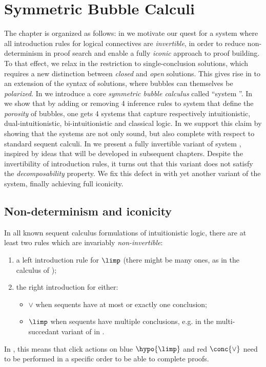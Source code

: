 \setchapterpreamble[u]{\margintoc}
\chapter{Symmetric Bubble Calculi}


The chapter is organized as follows: in  we motivate our
quest for a system where all introduction rules for logical connectives are
\emph{invertible}, in order to reduce non-determinism in proof search and enable
a fully \emph{iconic} approach to proof building. To that effect, we relax in
 the restriction to single-conclusion solutions, which
requires a new distinction between \emph{closed} and \emph{open} solutions. This
gives rise in  to an extension of the syntax of solutions, where
bubbles can themselves be \emph{polarized}. In  we
introduce a core \emph{symmetric bubble calculus} called ``system ''. In
 we show that by adding or removing 4 inference rules
to system  that define the \emph{porosity} of bubbles, one gets 4 systems
that capture respectively intuitionistic, dual-intuitionistic, bi-intuitionistic
and classical logic. In  we support this claim by
showing that the systems are not only sound, but also complete with respect to
standard sequent calculi. In  we present a fully
invertible variant of system , inspired by ideas that will be developed
in subsequent chapters. Despite the invertibility of introduction rules, it
turns out that this variant does not satisfy the \emph{decomposability}
property. We fix this defect in  with yet another
variant of the system, finally achieving full iconicity.

\section{Non-determinism and iconicity}

In all known sequent calculus formulations of intuitionistic logic, there are at
least two rules which are invariably \emph{non-invertible}:
\begin{enumerate}
  \item a left introduction rule for $\limp$ (there might be many ones, as in
  the calculus  of );
  \item the right introduction for either:
    \begin{itemize}
      \item $\lor$ when sequents have at most or exactly one conclusion;
      \item $\limp$ when sequents have multiple conclusions, e.g. in the
        multi-succedant variant of  in
        \cite{dyckhoff_contraction-free_1992}.
    \end{itemize}
\end{enumerate}
In , this means that click actions on blue $\hypo{\limp}$ and red
$\conc{\lor}$ need to be performed in a specific order to be able to complete
proofs.

